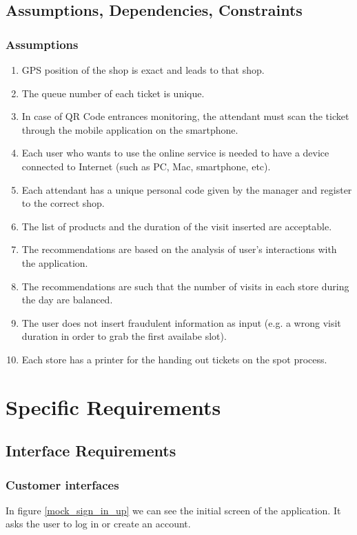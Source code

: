 \documentclass[table, 12pt]{article}
\begin{document}
\subsection{Assumptions, Dependencies, Constraints}
\subsubsection{Assumptions}
\begin{enumerate}[label=\textbf{D\arabic*}:]
    \item GPS position of the shop is exact and leads to that shop.
    \item The queue number of each ticket is unique.
    \item In case of QR Code entrances monitoring, the attendant must scan the ticket through the mobile application on the smartphone.
    \item Each user who wants to use the online service is needed to have a device connected to Internet (such as PC, Mac, smartphone, etc).
    \item Each attendant has a unique personal code given by the manager and register to the correct shop.
    \item The list of products and the duration of the visit inserted are acceptable.
    \item The recommendations are based on the analysis of user's interactions with the application.
    \item The recommendations are such that the number of visits in each store during the day are balanced.
    \item The user does not insert fraudulent information as input (e.g. a wrong visit duration in order to grab the first availabe slot).
    \item Each store has a printer for the handing out tickets on the spot process.
\end{enumerate}

\newpage
\section{Specific Requirements}
\subsection{Interface Requirements}
\subsubsection{Customer interfaces}
In figure \ref{mock_sign_in_up} we can see the initial screen of the application.
It asks the user to log in or create an account.
\end{document}
